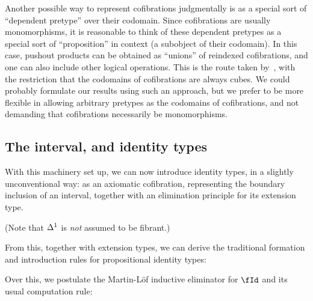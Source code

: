\documentclass{amsart}
\begin{document}
\begin{rmk}
  Another possible way to represent cofibrations judgmentally is as a special sort of ``dependent pretype'' over their codomain.
  Since cofibrations are usually monomorphisms, it is reasonable to think of these dependent pretypes as a special sort of ``proposition'' in context (a subobject of their codomain).
  In this case, pushout products can be obtained as ``unions'' of reindexed cofibrations, and one can also include other logical operations.
  This is the route taken by~\cite{coquand:ctt0915}, with the restriction that the codomains of cofibrations are always cubes.
  We could probably formulate our results using such an approach, but we prefer to be more flexible in allowing arbitrary pretypes as the codomains of cofibrations, and not demanding that cofibrations necessarily be monomorphisms.
\end{rmk}

\subsection{The interval, and identity types}

With this machinery set up, we can now introduce identity types, in a slightly unconventional way: as an axiomatic cofibration, representing the boundary inclusion of an interval, together with an elimination principle for its extension type.


(Note that ${\Delta^1}$ is \emph{not} assumed to be fibrant.)

From this, together with extension types, we can derive the traditional formation and introduction rules for propositional identity types:


Over this, we postulate the Martin-Löf inductive eliminator for $\fId$ and its usual computation rule:
\end{document}
